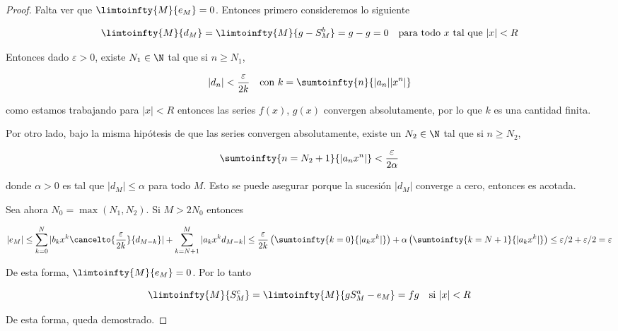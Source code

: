 \begin{proof}
    Falta ver que $\limtoinfty{M}{e_M} = 0$. Entonces primero consideremos lo siguiente
    
    \[
    \limtoinfty{M}{d_M} = \limtoinfty{M}{g-S_M^b} = g - g = 0 \quad \text{para todo $x$ tal que $|x|<R$}
    \]
    
    Entonces dado $\varepsilon > 0$, existe $N_1 \in \N$ tal que si $n \geq N_1$,
    
    \[
    |d_n| < \frac{\varepsilon}{2k} \quad \text{con $k = \sumtoinfty{n}{|a_n||x^n|}$}
    \]
    
    \noindent como estamos trabajando para $|x|<R$ entonces las series $f(x)$, $g(x)$ convergen absolutamente, por lo que $k$ es una cantidad finita.
    
    Por otro lado, bajo la misma hipótesis de que las series convergen absolutamente, existe un $N_2 \in \N$ tal que si $n \geq N_2$,
    
    \[
    \sumtoinfty{n=N_2+1}{|a_nx^n|} < \frac{\varepsilon}{2\alpha}
    \]
    
    \noindent donde $\alpha > 0$ es tal que $|d_M| \leq \alpha$ para todo $M$. Esto se puede asegurar porque la sucesión $|d_M|$ converge a cero, entonces es acotada.
    
    Sea ahora $N_0 = \max(N_1, N_2)$. Si $M > 2N_0$ entonces
    
    \[
    |e_M| \leq \sum_{k=0}^N |b_k x^k \cancelto{\frac{\varepsilon}{2k}}{d_{M-k}}| + \sum_{k=N+1}^M |a_k x^k d_{M-k}| \leq \frac{\varepsilon}{2k}\left(\sumtoinfty{k=0}{|a_k x^k|}\right) + \alpha \left(\sumtoinfty{k=N+1}{|a_kx^k|}\right) \leq \varepsilon/2 + \varepsilon/2 = \varepsilon
    \]
    
    De esta forma, $\limtoinfty{M}{e_M} = 0$. Por lo tanto
    
    \[
    \limtoinfty{M}{S_M^c} = \limtoinfty{M}{gS_M^a - e_M} = fg \quad \text{si $|x|<R$}
    \]
    
    De esta forma, queda demostrado.
\end{proof}